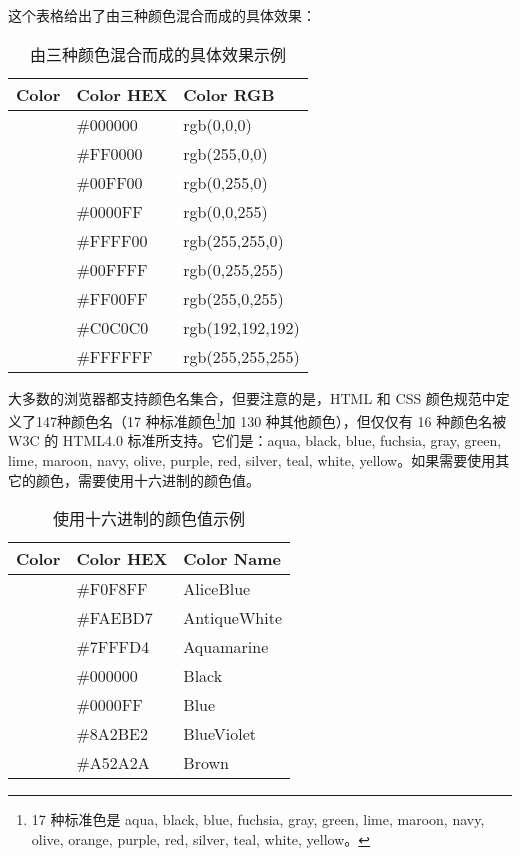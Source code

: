 这个表格给出了由三种颜色混合而成的具体效果：

\begin{table}[!h]
\centering
\caption{由三种颜色混合而成的具体效果示例}
\begin{tabular}{|p{100pt}|p{100pt}|p{100pt}|}
\hline
Color				&Color HEX		&Color RGB		\\
\hline
\cellcolor{Black}	&\#000000		&rgb(0,0,0)		\\
\hline
\cellcolor{Red}	&\#FF0000		&rgb(255,0,0)	\\
\hline
\cellcolor{Green}	&\#00FF00		&rgb(0,255,0)	\\
\hline
\cellcolor{Blue}	&\#0000FF		&rgb(0,0,255)	\\
\hline
\cellcolor{Yellow}	&\#FFFF00		&rgb(255,255,0)	\\
\hline
\cellcolor{Cyan}	&\#00FFFF		&rgb(0,255,255)	\\
\hline
\cellcolor{Magenta}	&\#FF00FF		&rgb(255,0,255)	\\
\hline
\cellcolor{Silver}	&\#C0C0C0		&rgb(192,192,192)\\
\hline
\cellcolor{White}	&\#FFFFFF		&rgb(255,255,255)\\
\hline
\end{tabular}
\end{table}

大多数的浏览器都支持颜色名集合，但要注意的是，HTML 和 CSS 颜色规范中定义了147种颜色名（17 种标准颜色\footnote{17 种标准色是 aqua, black, blue, fuchsia, gray, green, lime, maroon, navy, olive, orange, purple, red, silver, teal, white, yellow。}加 130 种其他颜色），但仅仅有 16 种颜色名被 W3C 的 HTML4.0 标准所支持。它们是：aqua, black, blue, fuchsia, gray, green, lime, maroon, navy, olive, purple, red, silver, teal, white, yellow。如果需要使用其它的颜色，需要使用十六进制的颜色值。

\begin{table}[!h]
\centering
\caption{使用十六进制的颜色值示例}
\begin{tabular}{|p{100pt}|p{100pt}|p{100pt}|}
\hline
Color				&Color HEX		&Color Name		\\
\hline
\cellcolor{AliceBlue}	&\#F0F8FF		&AliceBlue		\\
\hline
\cellcolor{AntiqueWhite}&\#FAEBD7		&AntiqueWhite	\\
\hline
\cellcolor{Aquamarine}	&\#7FFFD4		&Aquamarine	\\
\hline
\cellcolor{Black}		&\#000000		&Black	\\
\hline
\cellcolor{Blue}		&\#0000FF		&Blue	\\
\hline
\cellcolor{BlueViolet}	&\#8A2BE2		&BlueViolet	\\
\hline
\cellcolor{Brown}		&\#A52A2A		&Brown	\\
\hline
\end{tabular}
\end{table}


